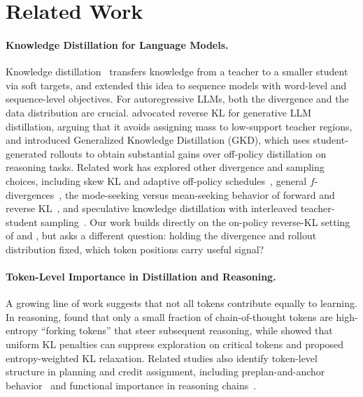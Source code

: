 
\section{Related Work}
\label{sec:related_work}

\paragraph{Knowledge Distillation for Language Models.}
Knowledge distillation~\citep{hinton2015distilling} transfers knowledge from a teacher to a smaller student via soft targets, and \citet{kim2016sequence} extended this idea to sequence models with word-level and sequence-level objectives.
For autoregressive LLMs, both the divergence and the data distribution are crucial.
\citet{gu2024minillm} advocated reverse KL for generative LLM distillation, arguing that it avoids assigning mass to low-support teacher regions, and \citet{agarwal2024onpolicy} introduced Generalized Knowledge Distillation (GKD), which uses student-generated rollouts to obtain substantial gains over off-policy distillation on reasoning tasks.
Related work has explored other divergence and sampling choices, including skew KL and adaptive off-policy schedules~\citep{ko2024distillm}, general $f$-divergences~\citep{wen2023fdivergence}, the mode-seeking versus mean-seeking behavior of forward and reverse KL~\citep{wu2025rethinking}, and speculative knowledge distillation with interleaved teacher-student sampling~\citep{xu2025speculative}.
Our work builds directly on the on-policy reverse-KL setting of \citet{gu2024minillm} and \citet{agarwal2024onpolicy}, but asks a different question: holding the divergence and rollout distribution fixed, which token positions carry useful signal?

\paragraph{Token-Level Importance in Distillation and Reasoning.}
A growing line of work suggests that not all tokens contribute equally to learning.
In reasoning, \citet{wang2025beyond8020} found that only a small fraction of chain-of-thought tokens are high-entropy ``forking tokens'' that steer subsequent reasoning, while \citet{vassoyan2025ignorekl} showed that uniform KL penalties can suppress exploration on critical tokens and proposed entropy-weighted KL relaxation.
Related studies also identify token-level structure in planning and credit assignment, including preplan-and-anchor behavior~\citep{li2025preplan} and functional importance in reasoning chains~\citep{singh2026functional}.

